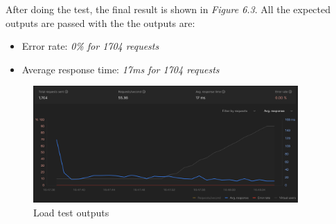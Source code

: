 After doing the test, the final result is shown in \textit{Figure 6.3}. All the expected outputs are passed with the the outputs are:
\begin{itemize}
  \item Error rate: \textit{0\% for 1704 requests}
  \item Average response time: \textit{17ms for 1704 requests}
\end{itemize}

\begin{figure}[H]
  \centering
  \includegraphics[width=0.9\textwidth]{Figures/load_test.png}
  \caption{Load test outputs}
\end{figure}